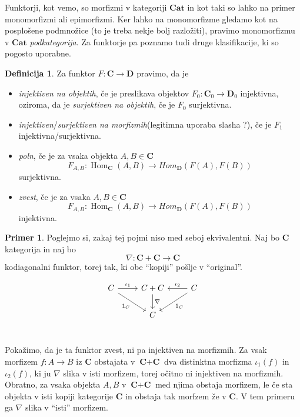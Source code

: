 \documentclass[12pt,a4paper]{book}
\theoremstyle{definition}
\newtheorem{definicija}{Definicija}[chapter]
\theoremstyle{plain}
\theoremstyle{definition}
\newtheorem{primer}{Primer}[section]
\theoremstyle{remark}
\newcommand{\cat}[1]{\textbf{#1}}
\DeclareMathOperator{\Hom}{Hom}
\begin{document}
Funktorji, kot vemo, so morfizmi v kategoriji $\cat{Cat}$ in kot taki so lahko na primer monomorfizmi ali epimorfizmi. Ker lahko na monomorfizme gledamo kot na posplošene podmnožice (to je treba nekje bolj razložiti), pravimo monomorfizmu v $\cat{Cat}$ \emph{podkategorija}. Za funktorje pa poznamo tudi druge klasifikacije, ki so pogosto uporabne.

\begin{definicija}
Za funktor $F : \cat{C} \to \cat{D}$ pravimo, da je 
\begin{itemize}
\item \emph{injektiven na objektih}, če je preslikava objektov $F_0 : \cat{C}_0 \to \cat{D}_0$ injektivna, oziroma, da je \emph{surjektiven na objektih}, če je $F_0$ surjektivna.
\item \emph{injektiven}/\emph{surjektiven na morfizmih}(legitimna uporaba slasha ?), če je $F_1$ injektivna/surjektivna.
\item \emph{poln}, če je za vsaka objekta $A,B \in \cat{C}$
$$F_{A,B} : \Hom_{\cat{C}}(A,B) \to Hom_{\cat{D}}(F(A),F(B))$$
surjektivna.
\item \emph{zvest}, če je za vsaka $A,B \in \cat{C}$
$$F_{A,B} : \Hom_{\cat{C}}(A,B) \to Hom_{\cat{D}}(F(A),F(B))$$
injektivna.
\end{itemize}
\end{definicija}

\begin{primer}
Poglejmo si, zakaj tej pojmi niso med seboj ekvivalentni. Naj bo $\cat{C}$ kategorija in naj bo 
$$\nabla : \cat{C} + \cat{C} \to \cat{C}$$ 
kodiagonalni funktor, torej tak, ki obe "`kopiji"' pošlje v "`original"'.

$$\begin{tikzcd}[column sep=normal]
C \ar[r, "\iota_1"] \ar[dr, "1_C"'] & C + C \ar[d, "\nabla"] & C \ar[l, "\iota_2"'] \ar[dl, "1_C"] \\
& C & \\
\end{tikzcd}$$

Pokažimo, da je ta funktor zvest, ni pa injektiven na morfizmih. 
Za vsak morfizem $f : A \to B$ iz $\cat{C}$ obstajata v $\cat{C} + \cat{C}$ dva distinktna morfizma $\iota_1(f)$ in $\iota_2(f)$, ki ju $\nabla$ slika v isti morfizem, torej očitno ni injektiven na morfizmih. Obratno, za vsaka objekta $A,B$ v $\cat{C} + \cat{C}$ med njima obstaja morfizem, le če sta objekta v isti kopiji kategorije $\cat{C}$ in obstaja tak morfzem že v $\cat{C}$. V tem primeru ga $\nabla$ slika v "`isti"' morfizem.

\end{primer}
\end{document}
